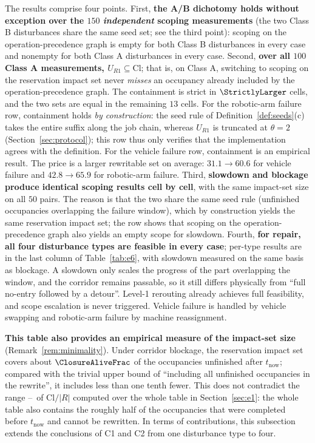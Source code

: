 The results comprise four points. First, \textbf{the A/B dichotomy holds without exception over the \(150\) \emph{independent} scoping measurements} (the two Class B disturbances share the same seed set; see the third point): scoping on the operation-precedence graph
is empty for both Class B disturbances in every case and nonempty for both Class A disturbances in every case. Second, \textbf{over all \(100\) Class A measurements,
\(U_{R1}\subseteq\mathrm{Cl}\)}; that is, on Class A, switching to scoping on the reservation impact set never \emph{misses}
an occupancy already included by the operation-precedence graph. The containment is strict in \(\StrictlyLarger\) cells, and the two sets are equal in the remaining \(13\) cells.
For the robotic-arm failure row, containment holds \emph{by construction}: the seed rule of Definition~\ref{def:seeds}(c) takes the entire suffix along the job chain,
whereas \(U_{R1}\) is truncated at \(\theta=2\) (Section~\ref{sec:protocol}); this row thus only verifies that the implementation agrees with the definition.
For the vehicle failure row, containment is an empirical result.
The price is a larger rewritable set on average: \(31.1\to 60.6\) for vehicle failure and \(42.8\to 65.9\) for robotic-arm failure.
Third, \textbf{slowdown and blockage produce identical scoping results cell by cell}, with the same impact-set size on all \(50\) pairs.
The reason is that the two share the same seed rule (unfinished occupancies overlapping the failure window), which by construction yields the same reservation impact set;
the row shows that scoping on the operation-precedence graph also yields an empty scope for slowdown.
Fourth, \textbf{for repair, all four disturbance types are feasible in every case}; per-type results are in the last column of Table~\ref{tab:e6}, with slowdown measured on the same basis as blockage.
A slowdown only scales the progress of the part overlapping the window, and the corridor remains passable,
so it still differs physically from ``full no-entry followed by a detour''. Level-1 rerouting already achieves full feasibility, and scope escalation is never triggered.
Vehicle failure is handled by vehicle swapping and robotic-arm failure by machine reassignment.

\textbf{This table also provides an empirical measure of the impact-set size} (Remark~\ref{rem:minimality}).
Under corridor blockage, the reservation impact set covers about \(\ClosureAliveFrac\) of the occupancies unfinished after \(t_{\mathrm{now}}\);
compared with the trivial upper bound of ``including all unfinished occupancies in the rewrite'', it includes less than one tenth fewer.
This does not contradict the range \EoneCloLo--\EoneCloHi\ of \(\mathrm{Cl}/|R|\) computed over the whole table in Section~\ref{sec:e1}:
the whole table also contains the roughly half of the occupancies that were completed before \(t_{\mathrm{now}}\) and cannot be rewritten.
In terms of contributions, this subsection extends the conclusions of C1 and C2 from one disturbance type to four.

